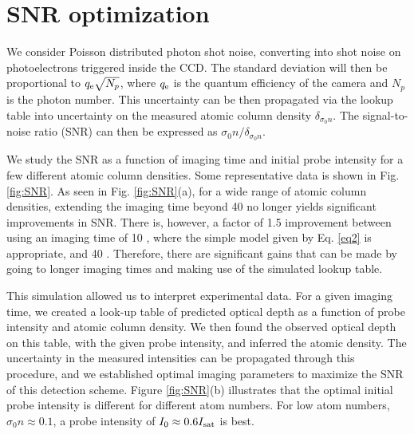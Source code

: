 \section{SNR optimization}

We consider Poisson distributed photon shot noise, converting into shot noise on photoelectrons triggered inside the CCD. The standard deviation will then be proportional to $q_{\rm{e}}\sqrt{N_p}$, where $q_{\rm{e}}$ is the quantum efficiency of the camera and $N_p$ is the photon number. This uncertainty can be then propagated via the lookup table into uncertainty on the measured atomic column density $\delta_{\sigma_0 n}$. The signal-to-noise ratio (SNR) can then be expressed as $\sigma_0 n/\delta_{\sigma_0 n}$.

We study the SNR as a function of imaging time and initial probe intensity for a few different atomic column densities. Some representative data is shown in  Fig. \ref{fig:SNR}. As seen in Fig. \ref{fig:SNR}(a), for a wide range of atomic column densities, extending the imaging time beyond 40 \us{} no longer yields significant improvements in SNR. There is, however, a factor of 1.5 improvement between using an imaging time of 10 \us{}, where the simple model given by Eq. \ref{eq2} is appropriate, and 40 \us{}. Therefore, there are significant gains that can be made by going to longer imaging times and making use of the simulated lookup table.  


This simulation allowed us to interpret experimental data. For a given imaging time, we created a look-up table of predicted optical depth as a function of probe intensity and atomic column density. We then found the observed optical depth on this table, with the given probe intensity, and inferred the atomic density. The uncertainty in the measured intensities can be propagated through this procedure, and we established optimal imaging parameters to maximize the SNR of this detection scheme. Figure \ref{fig:SNR}(b) illustrates that the optimal initial probe intensity is different for different atom numbers. For low atom numbers, $\sigma_0 n\approx0.1$, a probe intensity of $I_0\approx0.6 I_{\rm{sat}}$ is best.


